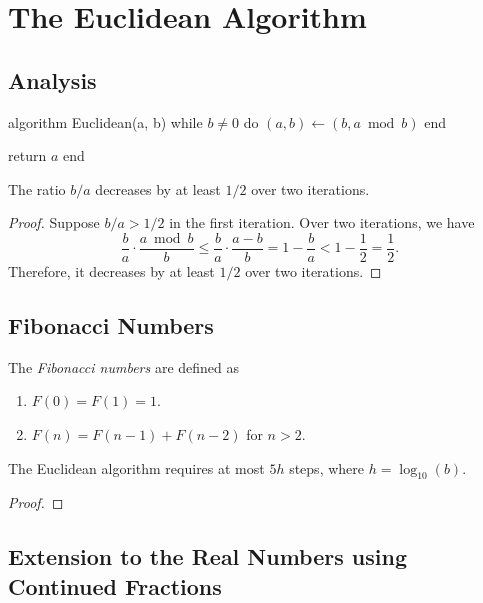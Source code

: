 \chapter{The Euclidean Algorithm}

\section{Analysis}

\begin{Pseudocode}
algorithm Euclidean(a, b)
  while $b ≠ 0$ do
    $(a, b) ← (b, a \bmod b)$
  end

  return $a$
end
\end{Pseudocode}

\begin{proposition}
  The ratio $b/a$ decreases by at least $1/2$ over two iterations.
\end{proposition}

\begin{proof}
  Suppose $b/a > 1/2$ in the first iteration.
  Over two iterations, we have
  \[
    \frac{b}{a} · \frac{a \bmod b}{b}
    ≤ \frac{b}{a} · \frac{a - b}{b}
    = 1 - \frac{b}{a}
    < 1 - \frac{1}{2}
    = \frac{1}{2}.
  \]
  Therefore, it decreases by at least $1/2$ over two iterations.
\end{proof}

\section{Fibonacci Numbers}

\begin{definition}
  The \emph{Fibonacci numbers} are defined as
  \begin{enumerate}
    \item $F(0) = F(1) = 1$.
    \item $F(n) = F(n - 1) + F(n - 2)$ for $n > 2$.
  \end{enumerate}
\end{definition}

\begin{proposition}
  The Euclidean algorithm requires at most $5h$ steps,
  where $h = \log_{10}(b)$.
\end{proposition}

\begin{proof}
\end{proof}

\section{Extension to the Real Numbers using Continued Fractions}

